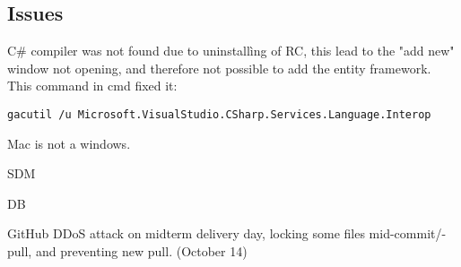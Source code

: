\subsection{Issues}
C\# compiler was not found due to uninstallìng of RC, this lead to the "add new" window not opening, and therefore not possible to add the entity framework.\\
This command in cmd fixed it:
\begin{verbatim}
gacutil /u Microsoft.VisualStudio.CSharp.Services.Language.Interop 
\end{verbatim}


Mac is not a windows.

SDM

DB

GitHub DDoS attack on midterm delivery day, locking some files mid-commit/-pull, and preventing new pull. (October 14)
